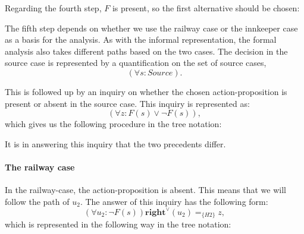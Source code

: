 			
		Regarding the fourth step, $F$ is present, so the first alternative should be chosen:
			
			\noindent\begin{minipage}{\textwidth}
			\end{minipage}\medskip			
		
		The fifth step depends on whether we use the railway case or the innkeeper case as a basis for the analysis. As with the informal representation, the formal analysis also takes different paths based on the two cases. The decision in the source case is represented by a quantification on the set of source cases,
			\[
				(\forall s : Source).
			\]
		
		This is followed up by an inquiry on whether the chosen action-proposition is present or absent in the source case. This inquiry is represented as:
			\[
				(\forall z : F(s) \lor \neg F(s)),
			\]	
		which gives us the following procedure in the tree notation:
		
			\noindent\begin{minipage}{\textwidth}
			\end{minipage}\medskip	
			
		\noindent It is in answering this inquiry that the two precedents differ. 
			
		\paragraph{The railway case}
			
			In the railway-case, the action-proposition is absent. This means that we will follow the path of $u_2$. The answer of this inquiry has the following form:
				\[
					(\forall u_2 : \neg F(s)) \textbf{right}^\lor (u_2) =_{\{H2\}} z,
				\]
			which is represented in the following way in the tree notation:
				\noindent\begin{minipage}{\textwidth}
				\end{minipage}\medskip
			
